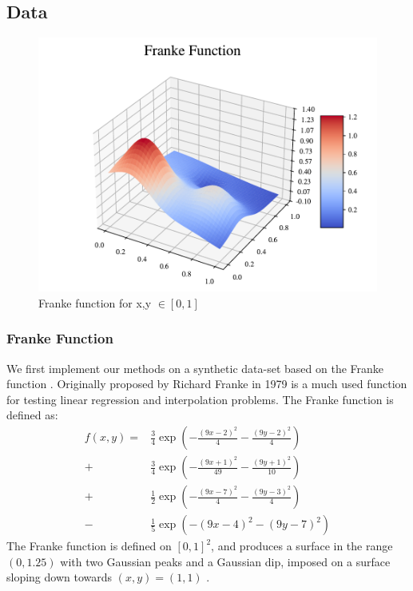 \subsection{Data}


\begin{figure}[h!]
\centering
\includegraphics[width=1\linewidth]{project_1_alt/figures/figures_in_report/franke_func.pdf}
\caption{Franke function for x,y $\in [0,1]$}
\label{franke}
\end{figure}

\subsubsection{Franke Function}
We first implement our methods on a synthetic data-set based on the Franke function \citep[p. 13]{frank}. Originally proposed by Richard Franke in 1979 is a much used function for testing linear regression and interpolation problems.
The Franke function is defined as:
\begin{align}\label{eq:franke}
    f(x, y) = &\frac{3}{4} \exp\left( -\frac{(9x - 2)^2}{4} - \frac{(9y - 2)^2}{4} \right) \nonumber \\
    + &\frac{3}{4} \exp\left( -\frac{(9x + 1)^2}{49} - \frac{(9y + 1)^2}{10} \right) \nonumber \\
    + &\frac{1}{2} \exp\left( -\frac{(9x - 7)^2}{4} - \frac{(9y - 3)^2}{4} \right) \nonumber \\
    - &\frac{1}{5} \exp\left( -(9x - 4)^2 - (9y - 7)^2 \right)
\end{align}
The Franke function is defined on $[0, 1]^2$, and produces a surface in the range $(0, 1.25)$ with two Gaussian peaks and a Gaussian dip, imposed on a surface sloping down towards $(x,y)=(1, 1)$ \citep[p. 13]{frank}.

